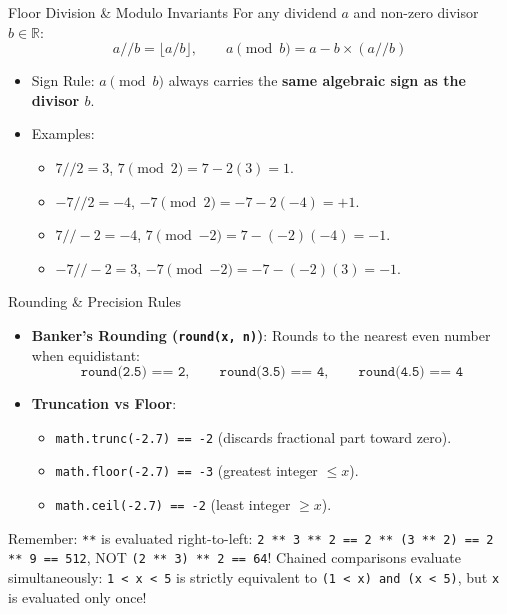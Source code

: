 \begin{formulabox}{Floor Division \& Modulo Invariants}
For any dividend $a$ and non-zero divisor $b \in \mathbb{R}$:
\begin{equation}
a // b = \lfloor a / b \rfloor, \qquad a \pmod b = a - b \times (a // b)
\end{equation}
\begin{itemize}[leftmargin=1.5em, itemsep=2pt]
    \item Sign Rule: $a \pmod b$ always carries the \textbf{same algebraic sign as the divisor $b$}.
    \item Examples:
    \begin{itemize}
        \item $7 // 2 = 3$, \quad $7 \pmod 2 = 7 - 2(3) = 1$.
        \item $-7 // 2 = -4$, \quad $-7 \pmod 2 = -7 - 2(-4) = +1$.
        \item $7 // -2 = -4$, \quad $7 \pmod{-2} = 7 - (-2)(-4) = -1$.
        \item $-7 // -2 = 3$, \quad $-7 \pmod{-2} = -7 - (-2)(3) = -1$.
    \end{itemize}
\end{itemize}
\end{formulabox}

\begin{formulabox}{Rounding \& Precision Rules}
\begin{itemize}[leftmargin=1.5em, itemsep=2pt]
    \item \textbf{Banker's Rounding (\texttt{round(x, n)})}: Rounds to the nearest even number when equidistant:
    \begin{equation*}
    \texttt{round(2.5) == 2}, \qquad \texttt{round(3.5) == 4}, \qquad \texttt{round(4.5) == 4}
    \end{equation*}
    \item \textbf{Truncation vs Floor}:
    \begin{itemize}
        \item \texttt{math.trunc(-2.7) == -2} (discards fractional part toward zero).
        \item \texttt{math.floor(-2.7) == -3} (greatest integer $\le x$).
        \item \texttt{math.ceil(-2.7) == -2} (least integer $\ge x$).
    \end{itemize}
\end{itemize}
\end{formulabox}

\begin{memorytip}
Remember: \texttt{**} is evaluated right-to-left: \texttt{2 ** 3 ** 2 == 2 ** (3 ** 2) == 2 ** 9 == 512}, NOT \texttt{(2 ** 3) ** 2 == 64}! Chained comparisons evaluate simultaneously: \texttt{1 < x < 5} is strictly equivalent to \texttt{(1 < x) and (x < 5)}, but \texttt{x} is evaluated only once!
\end{memorytip}
